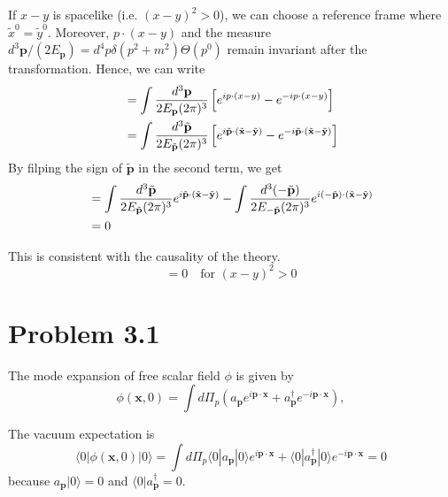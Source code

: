 \documentclass[a4paper,11pt]{article}
\begin{document}
If $x-y$ is spacelike (i.e. $(x-y)^2 > 0$), we can choose a reference frame where $\tilde{x}^0 = \tilde{y}^0$. Moreover, $p\cdot(x-y)$ and the measure $d^3\mathbf{p}/(2E_{\mathbf{p}})=d^4p\delta(p^2+m^2)\Theta(p^0)$ remain invariant after the transformation. Hence, we can write
\begin{align}
    [\phi(x), \phi(y)] &= \int \frac{d^3\mathbf{p}}{2E_{\mathbf{p}}(2\pi)^{3}} \left[e^{ip\cdot (x-y)} - e^{-ip\cdot (x-y)}\right] \notag\\
    &= \int \frac{d^3\tilde{\mathbf{p}}}{2E_{\tilde{\mathbf{p}}}(2\pi)^{3}} \left[e^{i\tilde{\mathbf{p}}\cdot (\tilde{\mathbf{x}} - \tilde{\mathbf{y}})} - e^{-i\tilde{\mathbf{p}}\cdot (\tilde{\mathbf{x}} - \tilde{\mathbf{y}})}\right]
\end{align}
By filping the sign of $\tilde{\mathbf{p}}$ in the second term, we get
\begin{align}
    [\phi(x), \phi(y)] &= \int \frac{d^3\tilde{\mathbf{p}}}{2E_{\tilde{\mathbf{p}}}(2\pi)^{3}} e^{i\tilde{\mathbf{p}}\cdot (\tilde{\mathbf{x}} - \tilde{\mathbf{y}})} - \int \frac{d^3(-\tilde{\mathbf{p}})}{2E_{-\tilde{\mathbf{p}}}(2\pi)^{3}} e^{i(-\tilde{\mathbf{p}})\cdot (\tilde{\mathbf{x}} - \tilde{\mathbf{y}})} \notag\\
    &= 0
\end{align}

This is consistent with the causality of the theory.
\begin{equation}
    [\phi(x), \phi(y)] = 0 \quad \text{for } (x-y)^2 > 0
\end{equation}


\section{Problem 3.1}

The mode expansion of free scalar field $\phi$ is given by
\begin{equation}
    \phi(\mathbf{x}, 0) = \int d\Pi_p\left(a_{\mathbf{p}}e^{i\mathbf{p}\cdot \mathbf{x}} + a_{\mathbf{p}}^\dagger e^{-i\mathbf{p}\cdot \mathbf{x}}\right),
\end{equation}

The vacuum expectation is 
\begin{equation}
    \langle0|\phi(\mathbf{x}, 0)|0\rangle = \int d\Pi_p \langle0|a_{\mathbf{p}}|0\rangle e^{i\mathbf{p}\cdot \mathbf{x}} + \langle0|a_{\mathbf{p}}^\dagger|0\rangle e^{-i\mathbf{p}\cdot \mathbf{x}} =0
\end{equation}
because $a_{\mathbf{p}}|0\rangle = 0$ and $\langle0|a_{\mathbf{p}}^\dagger = 0$.
\end{document}
